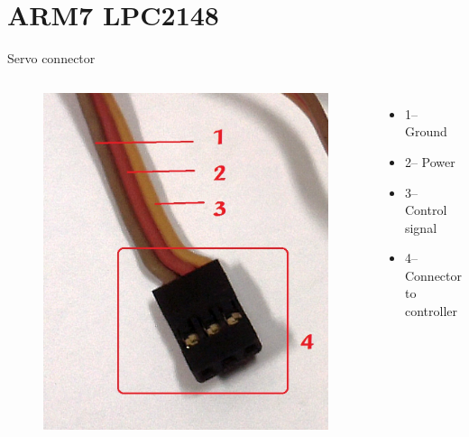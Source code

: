 \documentclass[table,10pt,red]{beamer}	%
\begin{document}
\section{ARM7 LPC2148}

\begin{frame}{Servo connector}
	\begin{columns}[c] %
		
		\begin{figure}			
			\includegraphics[width=\linewidth]{"servo female connector"}
		\end{figure}
		\begin{itemize}
			\item %
			1-- Ground
			\item %
			2-- Power
			\item %
			3-- Control signal
			\item
			4-- Connector to controller
		\end{itemize}	
	\end{columns}
\end{frame}
\end{document}
